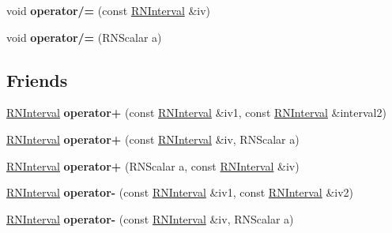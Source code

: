 \begin{DoxyCompactItemize}
\item 
void {\bfseries operator/=} (const \hyperlink{class_r_n_interval}{R\+N\+Interval} \&iv)\hypertarget{class_r_n_interval_a07cba5a30a73e42f0ae86cb71305d914}{}\label{class_r_n_interval_a07cba5a30a73e42f0ae86cb71305d914}

\item 
void {\bfseries operator/=} (R\+N\+Scalar a)\hypertarget{class_r_n_interval_a4ce522c3239b6fbb382d2244ef52ce3c}{}\label{class_r_n_interval_a4ce522c3239b6fbb382d2244ef52ce3c}

\end{DoxyCompactItemize}
\subsection*{Friends}
\begin{DoxyCompactItemize}
\item 
\hyperlink{class_r_n_interval}{R\+N\+Interval} {\bfseries operator+} (const \hyperlink{class_r_n_interval}{R\+N\+Interval} \&iv1, const \hyperlink{class_r_n_interval}{R\+N\+Interval} \&interval2)\hypertarget{class_r_n_interval_a93781176888f54ef46836734db8f060a}{}\label{class_r_n_interval_a93781176888f54ef46836734db8f060a}

\item 
\hyperlink{class_r_n_interval}{R\+N\+Interval} {\bfseries operator+} (const \hyperlink{class_r_n_interval}{R\+N\+Interval} \&iv, R\+N\+Scalar a)\hypertarget{class_r_n_interval_a3542f84ac5010f604dee092026d089c4}{}\label{class_r_n_interval_a3542f84ac5010f604dee092026d089c4}

\item 
\hyperlink{class_r_n_interval}{R\+N\+Interval} {\bfseries operator+} (R\+N\+Scalar a, const \hyperlink{class_r_n_interval}{R\+N\+Interval} \&iv)\hypertarget{class_r_n_interval_a002f58fe041590c02e6c0639aaf8ffeb}{}\label{class_r_n_interval_a002f58fe041590c02e6c0639aaf8ffeb}

\item 
\hyperlink{class_r_n_interval}{R\+N\+Interval} {\bfseries operator-\/} (const \hyperlink{class_r_n_interval}{R\+N\+Interval} \&iv1, const \hyperlink{class_r_n_interval}{R\+N\+Interval} \&iv2)\hypertarget{class_r_n_interval_a62dc9e23f2a62c87bb0c0a76145f7e26}{}\label{class_r_n_interval_a62dc9e23f2a62c87bb0c0a76145f7e26}

\item 
\hyperlink{class_r_n_interval}{R\+N\+Interval} {\bfseries operator-\/} (const \hyperlink{class_r_n_interval}{R\+N\+Interval} \&iv, R\+N\+Scalar a)\hypertarget{class_r_n_interval_a9f25032a22b9f917ab97ea401d3a7f2c}{}\label{class_r_n_interval_a9f25032a22b9f917ab97ea401d3a7f2c}


\end{DoxyCompactItemize}
